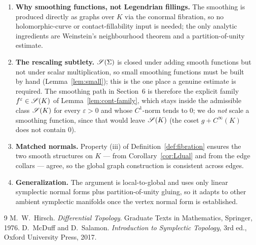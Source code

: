 \begin{enumerate}\setlength\itemsep{4pt}
\item \textbf{Why smoothing functions, not Legendrian fillings.} The smoothing is
produced directly as graphs over $K$ via the conormal fibration, so no
holomorphic-curve or contact-fillability input is needed; the only analytic
ingredients are Weinstein's neighbourhood theorem and a partition-of-unity
estimate.
\item \textbf{The rescaling subtlety.} $\mathscr S(\Sigma)$ is closed under adding
smooth functions but not under scalar multiplication, so small smoothing
functions must be built by hand (Lemma~\ref{lem:small}); this is the one place a
genuine estimate is required. The smoothing path in Section~6 is therefore the
explicit family $f^\varepsilon\in\mathscr S(K)$ of Lemma~\ref{lem:cont-family}, which
stays inside the admissible class $\mathscr S(K)$ for every $\varepsilon>0$ and whose
$C^1$-norm tends to $0$; we do \emph{not} scale a smoothing function, since that
would leave $\mathscr S(K)$ (the coset $g+C^\infty(K)$ does not contain $0$).
\item \textbf{Matched normals.} Property (iii) of Definition~\ref{def:fibration}
ensures the two smooth structures on $K$ — from Corollary~\ref{cor:Ldual} and from
the edge collars — agree, so the global graph construction is consistent across
edges.
\item \textbf{Generalization.} The argument is local-to-global and uses only
linear symplectic normal forms plus partition-of-unity gluing, so it adapts to
other ambient symplectic manifolds once the vertex normal form is established.
\end{enumerate}

\begin{thebibliography}{9}
 M.~W.~Hirsch.
  \emph{Differential Topology}. Graduate Texts in Mathematics, Springer, 1976.
 D.~McDuff and D.~Salamon.
  \emph{Introduction to Symplectic Topology}, 3rd ed.,
  Oxford University Press, 2017.
\end{thebibliography}

\endgroup
